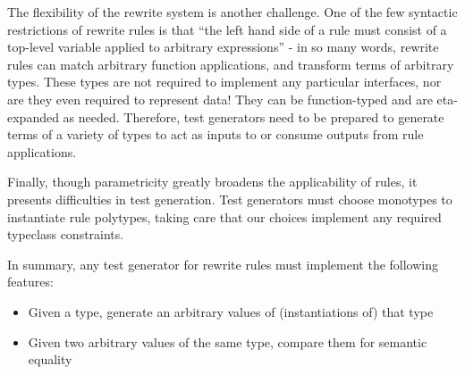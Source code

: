 The flexibility of the rewrite system is another challenge. One of the few syntactic restrictions of rewrite rules is that ``the left hand side of a rule must consist of a top-level variable applied to arbitrary expressions'' \cite{userguide} - in so many words, rewrite rules can match arbitrary function applications, and transform terms of arbitrary types. These types are not required to implement any particular interfaces, nor are they even required to represent data! They can be function-typed and are eta-expanded as needed. Therefore, test generators need to be prepared to generate terms of a variety of types to act as inputs to or consume outputs from rule applications.

Finally, though parametricity greatly broadens the applicability of rules, it presents difficulties in test generation. Test generators must choose monotypes to instantiate rule polytypes, taking care that our choices implement any required typeclass constraints.

In summary, any test generator for rewrite rules must implement the following features:

\begin{itemize}
  \item Given a type, generate an arbitrary values of (instantiations of) that type
  \item Given two arbitrary values of the same type, compare them for semantic equality
\end{itemize}

